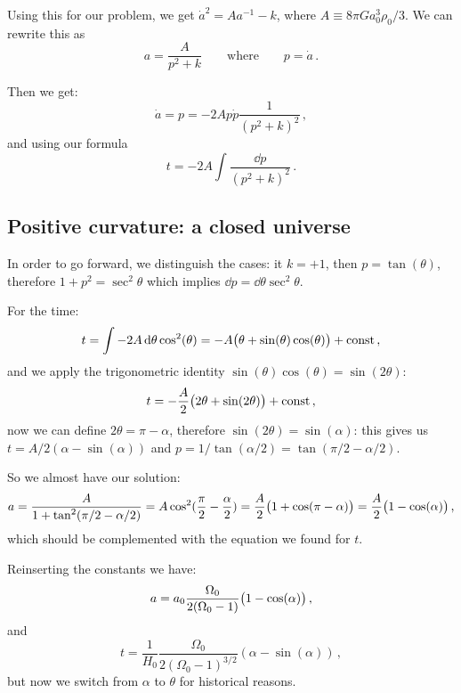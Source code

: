 \documentclass[main.tex]{subfiles}
\begin{document}
Using this for our problem, we get \(\dot{a}^2 = A a^{-1} - k \), where \(A \equiv 8 \pi G a_0^3 \rho_0 /3\). We can rewrite this as 
%
\begin{equation}
  a = \frac{A}{p^2+k} 
  \qquad \text{where} \qquad
  p = \dot{a} 
\,.
\end{equation}

Then we get: 
%
\begin{equation}
  \dot{a} = p = -2A  p \dot{p} \frac{1}{(p^2+k)^2}
\,,
\end{equation}
%
and using our formula 
%
\begin{equation}
  t = -2A \int \frac{\dd{p} }{(p^2+k)^2}
\,.
\end{equation}

\subsection{Positive curvature: a closed universe}

In order to go forward, we distinguish the cases: it \(k = +1\), then \(p = \tan(\theta ) \), therefore \(1 + p^2= \sec^2 \theta \) which implies \(\dd{p} = \dd{\theta } \sec^2 \theta  \).

For the time: 
%
\begin{equation}
  t = \int -2A \dd{\theta } \cos^2(\theta ) = -A \qty(\theta + \sin(\theta ) \cos(\theta ) ) + \text{const}
\,,
\end{equation}
%
and we apply the trigonometric identity \(\sin(\theta ) \cos(\theta ) = \sin(2 \theta ) \):
%
\begin{equation}
  t = -\frac{A}{2} \qty(2 \theta  + \sin(2 \theta ) ) + \text{const}
\,,
\end{equation}
%
now we can define \(2 \theta  = \pi - \alpha \), therefore \(\sin(2\theta ) = \sin(\alpha )  \): this gives us
\(t = A/2 (\alpha - \sin(\alpha ) )\) and \(p = 1/\tan(\alpha /2) = \tan(\pi /2 - \alpha /2) \).

So we almost have our solution: 
%
\begin{equation}
  a = \frac{A}{1 + \tan^2(\pi /2 - \alpha /2)} = A \cos^2(\frac{\pi}{2} - \frac{\alpha}{2})  = \frac{A}{2} \qty(1+\cos(\pi - \alpha ) ) = \frac{A}{2} \qty(1- \cos(\alpha ) )
\,,
\end{equation}
which should be complemented with the equation we found for \(t\).

Reinserting the constants we have:
%
\begin{equation}
  a = a_0 \frac{\Omega_0}{2 (\Omega_0 -1)} \qty(1- \cos(\alpha ) ) 
\,,
\end{equation}
%
and
%
\begin{equation}
  t = \frac{1}{H_0 } \frac{\Omega_0}{2 (\Omega_0 -1)^{3/2}}(\alpha - \sin(\alpha ) )
\,,
\end{equation}
%
but now we switch from \(\alpha \) to \(\theta \) for historical reasons.
\end{document}

